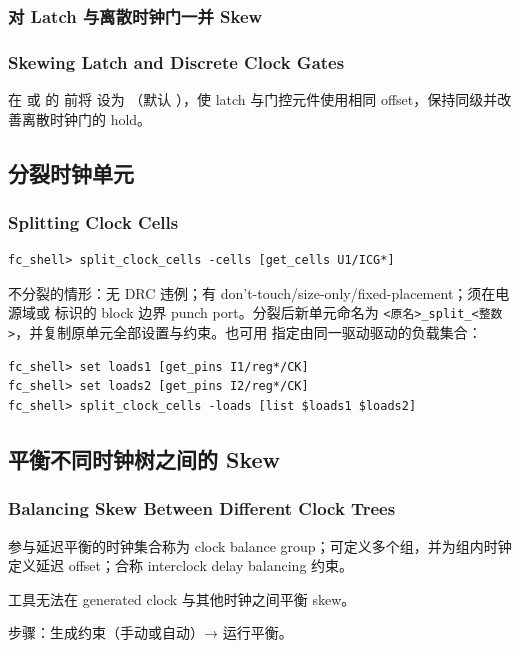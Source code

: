 \subsubsection{对 Latch 与离散时钟门一并 Skew}
\subsubsection*{Skewing Latch and Discrete Clock Gates}

在  或  的  前将  设为 （默认 ），使 latch 与门控元件使用相同 offset，保持同级并改善离散时钟门的 hold。

\subsection{分裂时钟单元}
\subsubsection*{Splitting Clock Cells}

\begin{lstlisting}
fc_shell> split_clock_cells -cells [get_cells U1/ICG*]
\end{lstlisting}
不分裂的情形：无 DRC 违例；有 don't-touch/size-only/fixed-placement；须在电源域或  标识的 block 边界 punch port。分裂后新单元命名为 \texttt{<原名>\_split\_<整数>}，并复制原单元全部设置与约束。也可用  指定由同一驱动驱动的负载集合：
\begin{lstlisting}
fc_shell> set loads1 [get_pins I1/reg*/CK]
fc_shell> set loads2 [get_pins I2/reg*/CK]
fc_shell> split_clock_cells -loads [list $loads1 $loads2]
\end{lstlisting}

\subsection{平衡不同时钟树之间的 Skew}
\subsubsection*{Balancing Skew Between Different Clock Trees}

参与延迟平衡的时钟集合称为 clock balance group；可定义多个组，并为组内时钟定义延迟 offset；合称 interclock delay balancing 约束。
\begin{noteBox}
工具无法在 generated clock 与其他时钟之间平衡 skew。
\end{noteBox}
步骤：生成约束（手动或自动）→ 运行平衡。

